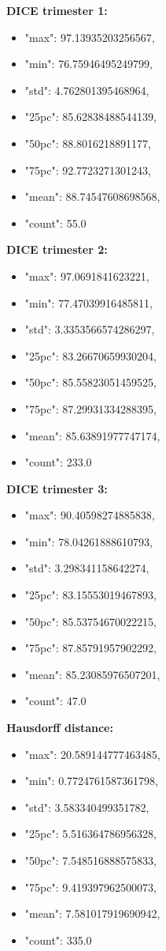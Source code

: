 	\textbf{DICE trimester 1:}
	\begin{itemize}
		\item "max": 97.13935203256567,
		\item "min": 76.75946495249799,
		\item "std": 4.762801395468964,
		\item "25pc": 85.62838488544139,
		\item "50pc": 88.8016218891177,
		\item "75pc": 92.7723271301243,
		\item "mean": 88.74547608698568,
		\item "count": 55.0
	\end{itemize}

	\textbf{DICE trimester 2:}
	\begin{itemize}
		\item "max": 97.0691841623221,
		\item "min": 77.47039916485811,
		\item "std": 3.3353566574286297,
		\item "25pc": 83.26670659930204,
		\item "50pc": 85.55823051459525,
		\item "75pc": 87.29931334288395,
		\item "mean": 85.63891977747174,
		\item "count": 233.0
	\end{itemize}

	\textbf{DICE trimester 3:}
	\begin{itemize}
		\item "max": 90.40598274885838,
		\item "min": 78.04261888610793,
		\item "std": 3.298341158642274,
		\item "25pc": 83.15553019467893,
		\item "50pc": 85.53754670022215,
		\item "75pc": 87.85791957902292,
		\item "mean": 85.23085976507201,
		\item "count": 47.0
	\end{itemize}

	\textbf{Hausdorff distance:}
	\begin{itemize}
		\item "max": 20.589144777463485,
		\item "min": 0.7724761587361798,
		\item "std": 3.583340499351782,
		\item "25pc": 5.516364786956328,
		\item "50pc": 7.548516888575833,
		\item "75pc": 9.419397962500073,
		\item "mean": 7.581017919690942,
		\item "count": 335.0
	\end{itemize}

